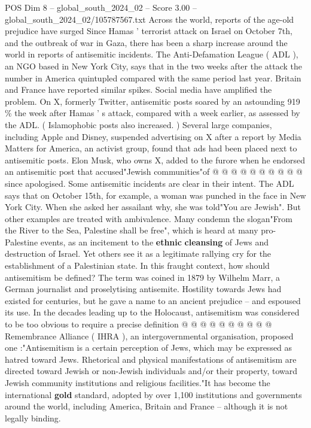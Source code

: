 \begin{textsample}{POS Dim 8 – global\_south\_2024\_02 – Score 3.00 – global\_south\_2024\_02/105787567.txt}  \label{ex:f8_pos_384}
Across the world, reports of the age-old prejudice have surged Since Hamas ' terrorist attack on Israel on October 7th, and the outbreak of war in Gaza, there has been a sharp increase around the world in reports of antisemitic incidents.
The Anti-Defamation League ( ADL ), an NGO based in New York City, says that in the two weeks after the attack the number in America quintupled compared with the same period last year.
Britain and France have reported similar spikes.
Social media have amplified the problem.
On X, formerly Twitter, antisemitic posts soared by an astounding 919 \% the week after Hamas ' s attack, compared with a week earlier, as assessed by the ADL. ( Islamophobic posts also increased. ) Several large companies, including Apple and Disney, suspended advertising on X after a report by Media Matters for America, an activist group, found that ads had been placed next to antisemitic posts.
Elon Musk, who owns X, added to the furore when he endorsed an antisemitic post that accused"Jewish communities"of @ @ @ @ @ @ @ @ @ @ since apologised.
Some antisemitic incidents are clear in their intent.
The ADL says that on October 15th, for example, a woman was punched in the face in New York City.
When she asked her assailant why, she was told"You are Jewish".
But other examples are treated with ambivalence.
Many condemn the slogan"From the River to the Sea, Palestine shall be free", which is heard at many pro-Palestine events, as an incitement to the \textbf{ethnic} \textbf{cleansing} of Jews and destruction of Israel.
Yet others see it as a legitimate rallying cry for the establishment of a Palestinian state.
In this fraught context, how should antisemitism be defined?
The term was coined in 1879 by Wilhelm Marr, a German journalist and proselytising antisemite.
Hostility towards Jews had existed for centuries, but he gave a name to an ancient prejudice -- and espoused its use.
In the decades leading up to the Holocaust, antisemitism was considered to be too obvious to require a precise definition @ @ @ @ @ @ @ @ @ @ Remembrance Alliance ( IHRA ), an intergovernmental organisation, proposed one :"Antisemitism is a certain perception of Jews, which may be expressed as hatred toward Jews.
Rhetorical and physical manifestations of antisemitism are directed toward Jewish or non-Jewish individuals and/or their property, toward Jewish community institutions and religious facilities."It has become the international \textbf{gold} standard, adopted by over 1,100 institutions and governments around the world, including America, Britain and France -- although it is not legally binding.

\end{textsample}
